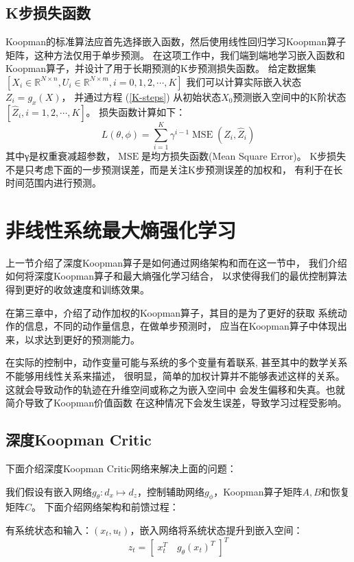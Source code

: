 \documentclass[AutoFakeBold]{LZUThesis}
\begin{document}
\subsection{K步损失函数}
Koopman的标准算法应首先选择嵌入函数，然后使用线性回归学习Koopman算子矩阵，这种方法仅用于单步预测。
在这项工作中，我们端到端地学习嵌入函数和Koopman算子，并设计了用于长期预测的K步预测损失函数。
给定数据集
$[ X_i \in \mathbb{R}^{N \times n}, U_i \in \mathbb{R}^{N \times m}, i = 0, 1, 2, \cdots, K]$
我们可以计算实际嵌入状态$Z_i = g_x(X)$，
并通过方程 (\ref{K-steps}) 从初始状态$X_0$预测嵌入空间中的K阶状态$[ \hat{Z}_i, i = 1, 2, \cdots, K]$。
损失函数计算如下：
\begin{equation}
  L(\theta, \phi)=\sum_{i=1}^{K} \gamma^{i-1} 
  \operatorname{MSE}\left(Z_{i}, \hat{Z}_{i}\right)
\end{equation}
其中γ是权重衰减超参数，$\operatorname{MSE}$是均方损失函数(Mean Square Error)。
K步损失不是只考虑下面的一步预测误差，而是关注K步预测误差的加权和，
有利于在长时间范围内进行预测。

\section{非线性系统最大熵强化学习}
上一节介绍了深度Koopman算子是如何通过网络架构和而在这一节中，
我们介绍如何将深度Koopman算子和最大熵强化学习结合，
以求使得我们的最优控制算法得到更好的收敛速度和训练效果。

在第三章中，介绍了动作加权的Koopman算子，其目的是为了更好的获取
系统动作的信息，不同的动作量信息，在做单步预测时，
应当在Koopman算子中体现出来，以求达到更好的预测能力。

在实际的控制中，动作变量可能与系统的多个变量有着联系,
甚至其中的数学关系不能够用线性关系来描述，
很明显，简单的加权计算并不能够表述这样的关系。
这就会导致动作的轨迹在升维空间或称之为嵌入空间中
会发生偏移和失真。也就简介导致了Koopman价值函数
在这种情况下会发生误差，导致学习过程受影响。

\subsection{深度Koopman Critic}
下面介绍深度Koopman Critic网络来解决上面的问题：

我们假设有嵌入网络$g_\theta : d_x \mapsto d_z$，控制辅助网络$g_\phi$，Koopman算子矩阵$A, B$和恢复矩阵$C$。
下面介绍网络架构和前馈过程：

有系统状态和输入：$(x_t, u_t)$，嵌入网络将系统状态提升到嵌入空间：
\begin{equation}
  z_t = [\; x_t^T \quad g_\theta(x_t)^T \;]^T
\end{equation}
\end{document}
